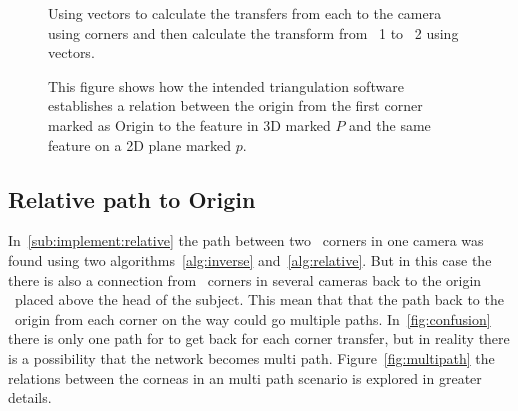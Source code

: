\begin{figure}
    \centering
    \caption[Calculate aruco transfers]{Using vectors to calculate the transfers from each \aruco to the camera using \aruco corners and then calculate the transform from \aruco\ 1 to \aruco\ 2 using vectors.}
    \label{fig:vector_transfers}
\end{figure}


\begin{figure}[ht]
    \begin{center}
        
    \end{center}
    \caption[Triangulations]{ This figure shows how the intended triangulation software establishes a relation between the origin from the first \aruco corner marked as Origin
        to the feature in 3D marked $P$ and the same feature on a 2D plane marked $p$.}
    \label{fig:camera_transfer}
\end{figure}




\subsection{Relative path to Origin}\label{sub:implement:relativepath}
In~\ref{sub:implement:relative} the path between two \aruco\ corners in one camera was found using two algorithms~\ref{alg:inverse} and~\ref{alg:relative}.
But in this case the there is also a connection from \aruco\ corners in several cameras back to the origin \aruco\ placed above the head of the subject.
This mean that that the path back to the \aruco\ origin from each corner on the way could go multiple paths.
In~\ref{fig:confusion} there is only one path for to get back for each corner transfer, but in reality there is a possibility that the network becomes multi path.
Figure~\ref{fig:multipath} the relations between the corneas in an multi path scenario is explored in greater details.


